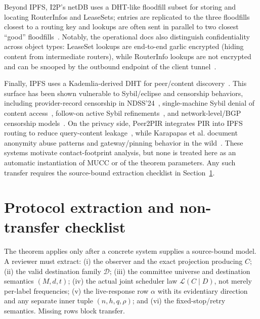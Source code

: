 \documentclass[11pt]{article}
\begin{document}
Beyond IPFS, I2P's netDB uses a DHT-like floodfill subset for storing and locating RouterInfos and LeaseSets; entries are replicated to the three floodfills closest to a routing key and lookups are often sent in parallel to two closest ``good'' floodfills~\cite{i2p_netdb_overview}.
Notably, the operational docs also distinguish confidentiality across object types: LeaseSet lookups are end-to-end garlic encrypted (hiding content from intermediate routers), while RouterInfo lookups are not encrypted and can be snooped by the outbound endpoint of the client tunnel~\cite{i2p_netdb_overview}.

Finally, IPFS uses a Kademlia-derived DHT for peer/content discovery~\cite{ipfs_kad_dht_spec}.
This surface has been shown vulnerable to Sybil/eclipse and censorship behaviors, including provider-record censorship in NDSS'24~\cite{sridhar2024ipfs_censorship}, single-machine Sybil denial of content access~\cite{cholez2024ipfs_sybil}, follow-on active Sybil refinements~\cite{netto2025ipfs_active_sybil}, and network-level/BGP censorship models~\cite{mattertran2025ipfs_censorship}.
On the privacy side, Peer2PIR integrates PIR into IPFS routing to reduce query-content leakage~\cite{mazmudar2024peer2pir}, while Karapapas et al. document anonymity abuse patterns and gateway/pinning behavior in the wild~\cite{karapapas2025ipfs_anonymity_abuse}.
These systems motivate contact-footprint analysis, but none is treated here as an automatic instantiation of MUCC or of the theorem parameters.  Any such transfer requires the source-bound extraction checklist in Section~\ref{sec:protocol-mapping}.




\section{Protocol extraction and non-transfer checklist}\label{sec:protocol-mapping}

The theorem applies only after a concrete system supplies a source-bound model.  A reviewer must extract: (i) the observer and the exact projection producing $C$; (ii) the valid destination family $\mathcal D$; (iii) the committee universe and destination semantics $(M,d,t)$; (iv) the actual joint scheduler law $\mathcal L(C\mid D)$, not merely per-label frequencies; (v) the live-response row $\alpha$ with its evidentiary direction and any separate inner tuple $(n,h,q,\rho)$; and (vi) the fixed-stop/retry semantics.  Missing rows block transfer.
\end{document}

